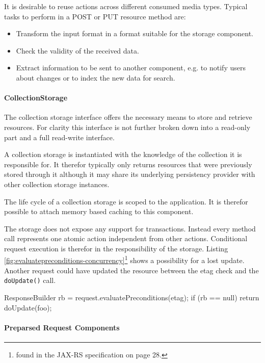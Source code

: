 \documentclass[12pt,a4paper]{scrartcl}		%
\begin{document}
It is desirable to reuse actions across different consumed media types. Typical
tasks to perform in a POST or PUT resource method are:
\begin{itemize}
\item Transform the input format in a format suitable for the storage component.
\item Check the validity of the received data.
\item Extract information to be sent to another component, e.g. to notify users
  about changes or to index the new data for search.
\end{itemize}

\paragraph{CollectionStorage}
\label{sec:collectionstorage}

The collection storage interface offers the necessary means to store and
retrieve resources. For clarity this interface is not further broken down into a
read-only part and a full read-write interface.

A collection storage is instantiated with the knowledge of the collection it is
responsible for. It therefor typically only returns resources that were
previously stored through it although it may share its underlying persistency
provider with other collection storage instances.

The life cycle of a collection storage is scoped to the application. It is
therefor possible to attach memory based caching to this component.

The storage does not expose any support for transactions. Instead every method
call represents one atomic action independent from other actions. Conditional
request execution is therefor in the responsibility of the storage. Listing
\ref{fig:evaluatepreconditions-concurrency}\footnote{found in the JAX-RS
  specification on page 28.} shows a possibility for a lost update. Another
request could have updated the resource between the etag check and the
\lstinline:doUpdate(): call.

\begin{javalisting}[label=fig:evaluatepreconditions-concurrency,
                   caption={Potential lost-update problem with JAX-RS}]
ResponseBuilder rb = request.evaluatePreconditions(etag);
if (rb == null)
  return doUpdate(foo);
\end{javalisting}


\paragraph{Preparsed Request Components}
\label{sec:prep-requ-comp}
\end{document}
